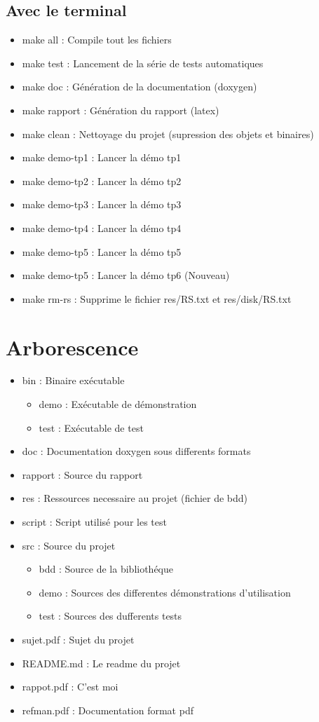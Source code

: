 \documentclass[a4paper]{article}
\begin{document}
\subsection{Avec le terminal}

\begin{itemize}
	\item make all : Compile tout les fichiers
	\item make test : Lancement de la série de tests automatiques
	\item make doc  : Génération de la documentation (doxygen)
	\item make rapport : Génération du rapport (latex)
	\item make clean : Nettoyage du projet (supression des objets et binaires)
	\item make demo-tp1 : Lancer la démo tp1
	\item make demo-tp2 : Lancer la démo tp2
	\item make demo-tp3 : Lancer la démo tp3
	\item make demo-tp4 : Lancer la démo tp4
	\item make demo-tp5 : Lancer la démo tp5
  \item make demo-tp5 : Lancer la démo tp6 (Nouveau)
	\item make rm-rs : Supprime le fichier res/RS.txt et res/disk/RS.txt
\end{itemize}

\section{Arborescence}

\begin{itemize}
\item bin : Binaire exécutable
\begin{itemize}
  \item demo : Exécutable de démonstration
  \item test : Exécutable de test
\end{itemize}
\item doc : Documentation doxygen sous differents formats
\item rapport : Source du rapport
\item res : Ressources necessaire au projet (fichier de bdd)
\item script  : Script utilisé pour les test
\item src : Source du projet
\begin{itemize}
  \item bdd   : Source de la bibliothéque
  \item demo  : Sources des differentes démonstrations d'utilisation
  \item test  : Sources des dufferents tests
\end{itemize}

\item sujet.pdf  : Sujet du projet
\item README.md  : Le readme du projet
\item rappot.pdf : C'est moi
\item refman.pdf : Documentation format pdf
\end{itemize}
\end{document}

